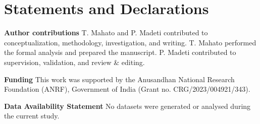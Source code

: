 \documentclass[10pt,a4paper,reqno]{amsart}
\theoremstyle{definition}
\theoremstyle{remark}
\begin{document}
\section*{Statements and Declarations}

\textbf{Author contributions} T. Mahato and P. Madeti contributed to
conceptualization, methodology, investigation, and writing. T. Mahato performed the formal analysis and prepared the
manuscript. P. Madeti contributed to supervision, validation, and
review \& editing.
\vspace{3mm}


\textbf{Funding} This work was supported by the Anusandhan National
Research Foundation (ANRF), Government of India (Grant no.
CRG/2023/004921/343).
\vspace{3mm}


\textbf{Data Availability Statement} No datasets were generated or
analysed during the current study.
\vspace{3mm}
\end{document}
